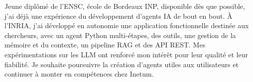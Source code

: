 
\begin{cvparagraph}
Jeune diplômé de l’ENSC, école de Bordeaux INP, disponible dès que possible, j’ai déjà une expérience du développement d’agents IA de bout en bout. À l’INRIA, j’ai développé en autonomie une application fonctionnelle destinée aux chercheurs, avec un agent Python multi-étapes, des outils, une gestion de la mémoire et du contexte, un pipeline RAG et des API REST. Mes expérimentations sur les LLM ont renforcé mon intérêt pour leur qualité et leur fiabilité. Je souhaite poursuivre la création d’agents utiles aux utilisateurs et continuer à monter en compétences chez Inetum.
\end{cvparagraph}
